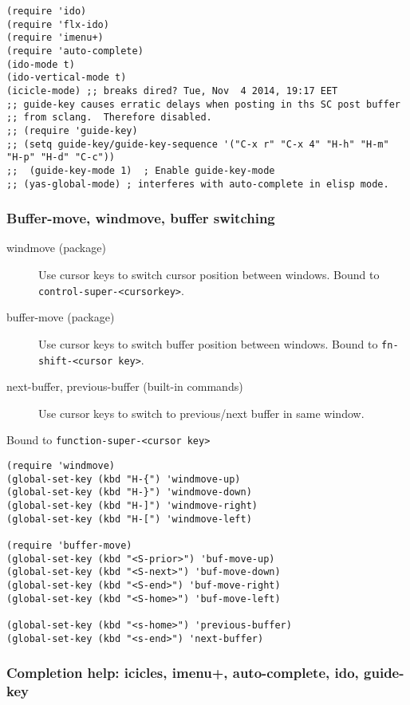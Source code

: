 \documentclass[nofonts]{tufte-handout}
\begin{document}
\begin{verbatim}
(require 'ido)
(require 'flx-ido)
(require 'imenu+)
(require 'auto-complete)
(ido-mode t)
(ido-vertical-mode t)
(icicle-mode) ;; breaks dired? Tue, Nov  4 2014, 19:17 EET
;; guide-key causes erratic delays when posting in ths SC post buffer
;; from sclang.  Therefore disabled.
;; (require 'guide-key)
;; (setq guide-key/guide-key-sequence '("C-x r" "C-x 4" "H-h" "H-m" "H-p" "H-d" "C-c"))
;;  (guide-key-mode 1)  ; Enable guide-key-mode
;; (yas-global-mode) ; interferes with auto-complete in elisp mode.
\end{verbatim}


\subsubsection{Buffer-move, windmove, buffer switching}
\label{sec-1-11-7}

\begin{description}
\item[{windmove (package)}] Use cursor keys to switch cursor position between windows.  Bound to \texttt{control-super-<cursorkey>}.
\item[{buffer-move (package)}] Use cursor keys to switch buffer position between windows.  Bound to \texttt{fn-shift-<cursor key>}.
\item[{next-buffer, previous-buffer (built-in commands)}] Use cursor keys to switch to previous/next buffer in same window.
\end{description}

Bound to \texttt{function-super-<cursor key>}

\begin{verbatim}
(require 'windmove)
(global-set-key (kbd "H-{") 'windmove-up)
(global-set-key (kbd "H-}") 'windmove-down)
(global-set-key (kbd "H-]") 'windmove-right)
(global-set-key (kbd "H-[") 'windmove-left)

(require 'buffer-move)
(global-set-key (kbd "<S-prior>") 'buf-move-up)
(global-set-key (kbd "<S-next>") 'buf-move-down)
(global-set-key (kbd "<S-end>") 'buf-move-right)
(global-set-key (kbd "<S-home>") 'buf-move-left)

(global-set-key (kbd "<s-home>") 'previous-buffer)
(global-set-key (kbd "<s-end>") 'next-buffer)
\end{verbatim}
\subsubsection{Completion help: icicles, imenu+, auto-complete, ido, guide-key}
\label{sec-1-11-8}
\end{document}
